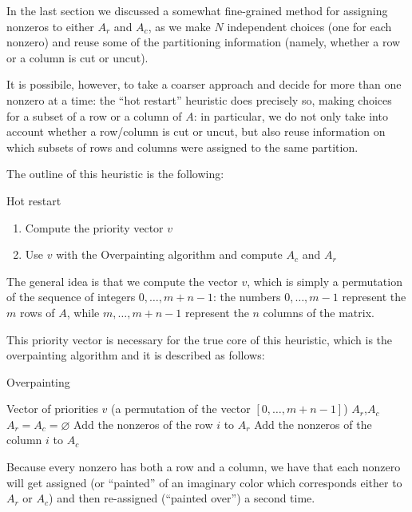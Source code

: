 

In the last section we discussed a somewhat fine-grained method for assigning nonzeros to either $A_r$ and $A_c$, as we make $N$ independent choices (one for each nonzero) and reuse some of the partitioning information (namely, whether a row or a column is cut or uncut).

It is possibile, however, to take a coarser approach and decide for more than one nonzero at a time: the ``hot restart'' heuristic does precisely so, making choices for a subset of a row or a column of $A$: in particular, we do not only take into account whether a row/column is cut or uncut, but also reuse information on which subsets of rows and columns were assigned to the same partition.

The outline of this heuristic is the following:

\begin{algorithm}[H]
 \caption{Hot restart}
 \begin{enumerate}[(1)]
  \item Compute the priority vector $v$
  \item Use $v$ with the Overpainting algorithm and compute $A_c$ and $A_r$
 \end{enumerate}
\end{algorithm}

The general idea is that we compute the vector $v$, which is simply a permutation of the sequence of integers $0,\dots,m+n-1$: the numbers $0,\dots,m-1$ represent the $m$ rows of $A$, while $m,\dots,m+n-1$ represent the $n$ columns of the matrix.

This priority vector is necessary for the true core of this heuristic, which is the overpainting algorithm and it is described  as follows:

\begin{algorithm}[H]
\caption{Overpainting} \label{alg:overpainting}
\begin{algorithmic}
\STATE
\REQUIRE Vector of priorities $v$ (a permutation of the vector $[0,\dots,m+n-1]$)
\ENSURE $A_r$,$A_c$
\STATE
\STATE $A_r = A_c = \varnothing$
\STATE Add the nonzeros of the row $i$ to $A_r$
\ELSE
\STATE Add the nonzeros of the column $i$ to $A_c$
\ENDIF
\ENDFOR
\end{algorithmic}
\end{algorithm}

Because every nonzero has both a row and a column, we have that each nonzero will get assigned (or ``painted'' of an imaginary color which corresponds either to $A_r$ or $A_c$) and then re-assigned (``painted over'') a second time.

